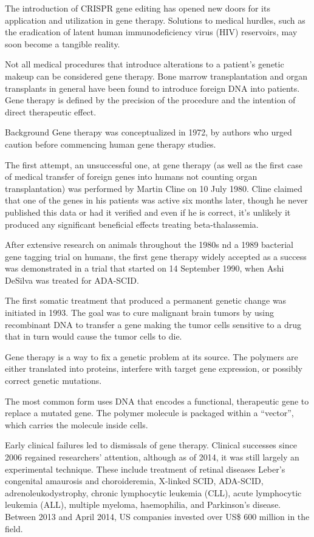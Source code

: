 The introduction of CRISPR gene editing has opened new doors for its application and utilization in gene therapy. Solutions to medical hurdles, such as the eradication of latent human immunodeficiency virus (HIV) reservoirs, may soon become a tangible reality.

Not all medical procedures that introduce alterations to a patient's genetic makeup can be considered gene therapy. Bone marrow transplantation and organ transplants in general have been found to introduce foreign DNA into patients. Gene therapy is defined by the precision of the procedure and the intention of direct therapeutic effect.

Background
Gene therapy was conceptualized in 1972, by authors who urged caution before commencing human gene therapy studies.

The first attempt, an unsuccessful one, at gene therapy (as well as the first case of medical transfer of foreign genes into humans not counting organ transplantation) was performed by Martin Cline on 10 July 1980. Cline claimed that one of the genes in his patients was active six months later, though he never published this data or had it verified and even if he is correct, it's unlikely it produced any significant beneficial effects treating beta-thalassemia.

After extensive research on animals throughout the 1980s nd a 1989 bacterial gene tagging trial on humans, the first gene therapy widely accepted as a success was demonstrated in a trial that started on 14 September 1990, when Ashi DeSilva was treated for ADA-SCID.

The first somatic treatment that produced a permanent genetic change was initiated in 1993. The goal was to cure malignant brain tumors by using recombinant DNA to transfer a gene making the tumor cells sensitive to a drug that in turn would cause the tumor cells to die.

Gene therapy is a way to fix a genetic problem at its source. The polymers are either translated into proteins, interfere with target gene expression, or possibly correct genetic mutations.

The most common form uses DNA that encodes a functional, therapeutic gene to replace a mutated gene. The polymer molecule is packaged within a ``vector'', which carries the molecule inside cells.

Early clinical failures led to dismissals of gene therapy. Clinical successes since 2006 regained researchers' attention, although as of 2014, it was still largely an experimental technique. These include treatment of retinal diseases Leber's congenital amaurosis and choroideremia, X-linked SCID, ADA-SCID, adrenoleukodystrophy, chronic lymphocytic leukemia (CLL), acute lymphocytic leukemia (ALL), multiple myeloma, haemophilia, and Parkinson's disease. Between 2013 and April 2014, US companies invested over US\$ 600 million in the field.

